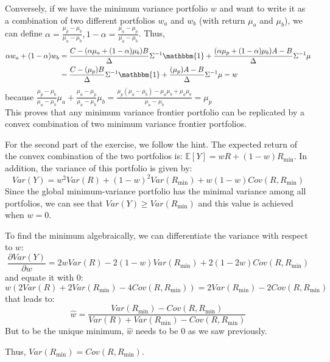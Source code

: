 \documentclass[10pt]{article}
\newcommand{\Ebb}{\mathbb{E}}
\newenvironment{exercise}[2][Exercise]{\begin{trivlist}
  \item[\hskip \labelsep {\bfseries #1}\hskip \labelsep {\bfseries #2.}]}{\end{trivlist}}
\begin{document}
\begin{exercise}{2}
  Conversely, if we have the minimum variance portfolio $w$ and want to write it as a combination of two different portfolios $w_a$ and $w_b$ (with return $\mu_a$ and $\mu_b$), we can define $\alpha = \frac{\mu_p-\mu_b}{\mu_a-\mu_b}, 1- \alpha = \frac{\mu_a - \mu_p}{\mu_a - \mu_b}$. 
  Thus, \begin{align*}
    \alpha w_a + (1-\alpha)w_b &= \frac{C- (\alpha\mu_a+(1-\alpha)\mu_b)B}{\Delta}\Sigma^{-1}\mathbbm{1} + \frac{(\alpha\mu_p + (1-\alpha)\mu_b)A-B}{\Delta}\Sigma^{-1}\mu \\
    &= \frac{C- (\mu_p)B}{\Delta}\Sigma^{-1}\mathbbm{1} + \frac{(\mu_p)A-B}{\Delta}\Sigma^{-1}\mu = w
  \end{align*} because $ \frac{\mu_p-\mu_b}{\mu_a-\mu_b}\mu_a + \frac{\mu_a - \mu_p}{\mu_a - \mu_b}\mu_b = \frac{\mu_p(\mu_a-\mu_b)-\mu_a\mu_b + \mu_a\mu_b}{\mu_a-\mu_b} = \mu_p$
\\
  This proves that any minimum variance frontier portfolio can be replicated by a convex combination of two minimum variance frontier portfolios. 

  For the second part of the exercise, we follow the hint. The expected return of the convex combination of the two portfolios is: $ \Ebb[Y] = wR + (1-w)R_{\text{min}}$. In addition, the variance of this portfolio is given by:
  $$ Var(Y) = w^2Var(R) + (1-w)^2Var(R_{\text{min}}) + w(1-w)Cov(R,R_{\text{min}})$$
  Since the global minimum-variance portfolio has the minimal variance among all portfolios, we can see that $Var(Y) \geq Var(R_{\text{min}})$ and this value is achieved when $w = 0$. 

  To find the minimum algebraically, we can differentiate the variance with respect to $w$: $$ \frac{\partial Var(Y)}{\partial w } = 2wVar(R) - 2(1-w)Var(R_{\text{min}})+2(1-2w)Cov(R,R_{\text{min}})$$ and equate it with $0$:
  $$ w(2Var(R) + 2Var(R_{\text{min}})-4Cov(R,R_{\text{min}})) = 2Var(R_{\text{min}})-2Cov(R,R_{\text{min}})$$ that leads to: 
  $$ \hat{w} = \frac{Var(R_{\text{min}})-Cov(R,R_{\text{min}})}{Var(R)+Var(R_{\text{min}})-Cov(R,R_{\text{min}})}$$
  But to be the unique minimum, $\hat{w}$ needs to be $0$ as we saw previously. 

  Thus, $ Var(R_{\text{min}}) = Cov(R,R_{\text{min}})$.

\end{exercise}
  
\end{document}
